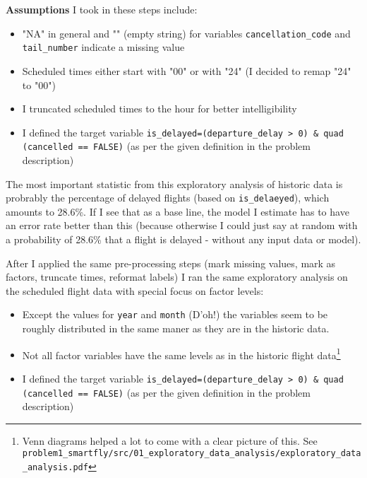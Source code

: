 \documentclass{article}
\begin{document}
\textbf{Assumptions} I took in these steps include: 
\begin{itemize}
	\item "NA" in general and "" (empty string) for variables \verb+cancellation_code+ and \verb+tail_number+ indicate a missing value
	\item Scheduled times either start with "00" or with "24" (I decided to remap "24" to "00")
	\item I truncated scheduled times to the hour for better intelligibility
	\item I defined the target variable \verb+is_delayed=(departure_delay > 0) & quad (cancelled == FALSE)+ (as per the given definition in the problem description)
\end{itemize}

The most important statistic from this exploratory analysis of historic data is probrably the percentage of delayed flights (based on \verb+is_delaeyed+), which amounts to 28.6\%. If I see that as a base line, the model I estimate has to have an error rate better than this (because otherwise I could just say at random with a probability of 28.6\% that a flight is delayed - without any input data or model).

After I applied the same pre-processing steps (mark missing values, mark as factors, truncate times, reformat labels) I ran the same exploratory analysis on the scheduled flight data with special focus on factor levels:
\begin{itemize}
	\item Except the values for \verb+year+ and \verb+month+ (D'oh!) the variables seem to be roughly distributed in the same maner as they are in the historic data.
	\item Not all factor variables have the same levels as in the historic flight data\footnote{Venn diagrams helped a lot to come with a clear picture of this. See \verb+problem1_smartfly/src/01_exploratory_data_analysis/exploratory_data_analysis.pdf+}
	\item I defined the target variable \verb+is_delayed=(departure_delay > 0) & quad (cancelled == FALSE)+ (as per the given definition in the problem description)
\end{itemize}
\end{document}
